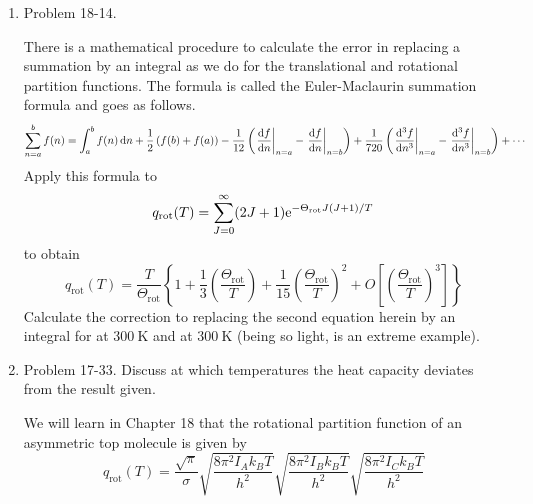 \documentclass[../psets.tex]{subfiles}
\begin{document}
\begin{enumerate}
\begin{enumerate}
\begin{proof}
\begin{align*}
            \end{align*}
            Therefore,
            \begin{align*}
                \prb{P} &= k_BT\pdv{\ln Q}{V}\\
                &= k_BT\pdv{V}(N\ln(V-b))\\
                \Aboxed{\prb{P} &= \frac{Nk_BT}{V-b}}
            \end{align*}
        \end{proof}
    \end{enumerate}
    \item Problem 18-14.\par
    There is a mathematical procedure to calculate the error in replacing a summation by an integral as we do for the translational and rotational partition functions. The formula is called the Euler-Maclaurin summation formula and goes as follows.
    \begin{equation*}
        \sum_{n=a}^bf(n) = \int_a^bf(n)\dd{n}+\frac{1}{2}\left( f(b)+f(a) \right)-\frac{1}{12}\left( \eval{\dv{f}{n}}_{n=a}-\eval{\dv{f}{n}}_{n=b} \right)+\frac{1}{720}\left( \eval{\dv[3]{f}{n}}_{n=a}-\eval{\dv[3]{f}{n}}_{n=b} \right)+\cdots
    \end{equation*}
    Apply this formula to
    \begin{equation*}
        q_\text{rot}(T) = \sum_{J=0}^\infty(2J+1)\e[-\Theta_\text{rot}J(J+1)/T]
    \end{equation*}
    to obtain
    \begin{equation*}
        q_\text{rot}(T) = \frac{T}{\Theta_\text{rot}}\left\{ 1+\frac{1}{3}\left( \frac{\Theta_\text{rot}}{T} \right)+\frac{1}{15}\left( \frac{\Theta_\text{rot}}{T} \right)^2+O\left[ \left( \frac{\Theta_\text{rot}}{T} \right)^3 \right] \right\}
    \end{equation*}
    Calculate the correction to replacing the second equation herein by an integral for  at $\SI{300}{\kelvin}$ and  at $\SI{300}{\kelvin}$ (being so light,  is an extreme example).
    \item Problem 17-33. Discuss at which temperatures the heat capacity deviates from the result given.\par
    We will learn in Chapter 18 that the rotational partition function of an asymmetric top molecule is given by
    \begin{equation*}
        q_\text{rot}(T) = \frac{\sqrt{\pi}}{\sigma}\sqrt{\frac{8\pi^2I_Ak_BT}{h^2}}\sqrt{\frac{8\pi^2I_Bk_BT}{h^2}}\sqrt{\frac{8\pi^2I_Ck_BT}{h^2}}

\end{equation*}
\end{enumerate}
\end{document}
